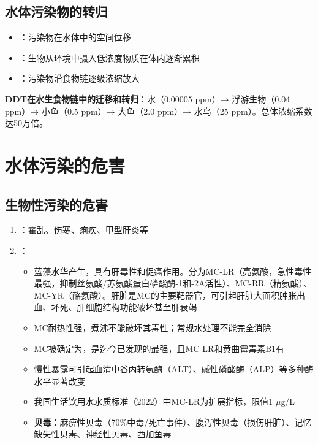 \subsection{水体污染物的转归}

\begin{itemize}[leftmargin=*]
    \item {}：污染物在水体中的空间位移
    \item {}：生物从环境中摄入低浓度物质在体内逐渐累积
    \item {}：污染物沿食物链逐级浓缩放大
\end{itemize}

\begin{tipbox}
\textbf{DDT在水生食物链中的迁移和转归}：水（0.00005 ppm）→ 浮游生物（0.04 ppm）→ 小鱼（0.5 ppm）→ 大鱼（2.0 ppm）→ 水鸟（25 ppm）。总体浓缩系数达50万倍。
\end{tipbox}

\section{水体污染的危害}

\subsection{生物性污染的危害}

\begin{enumerate}[leftmargin=*]
    \item {}：霍乱、伤寒、痢疾、甲型肝炎等
    \item {}：
    \begin{itemize}
        \item 蓝藻水华产生，具有肝毒性和促癌作用。分为MC-LR（亮氨酸，急性毒性最强，抑制丝氨酸/苏氨酸蛋白磷酸酶-1和-2A活性）、MC-RR（精氨酸）、MC-YR（酪氨酸）。肝脏是MC的主要靶器官，可引起肝脏大面积肿胀出血、坏死、肝细胞结构功能破坏甚至肝衰竭
        \item MC耐热性强，煮沸不能破坏其毒性；常规水处理不能完全消除
        \item MC被确定为，是迄今已发现的最强，且MC-LR和黄曲霉毒素B1有
        \item 慢性暴露可引起血清中谷丙转氨酶（ALT）、碱性磷酸酶（ALP）等多种酶水平显著改变
        \item 我国生活饮用水水质标准（2022）中MC-LR为扩展指标，限值1 $\mu$g/L
        \item \textbf{贝毒}：麻痹性贝毒（70\%中毒/死亡事件）、腹泻性贝毒（损伤肝脏）、记忆缺失性贝毒、神经性贝毒、西加鱼毒
    \end{itemize}
\end{enumerate}

